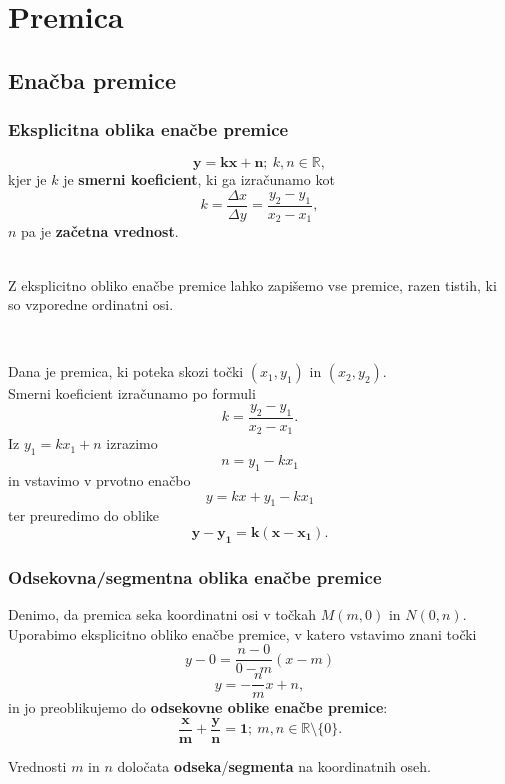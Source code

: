 \chapter{Premica}

    \section{Enačba premice}


            \subsection*{Eksplicitna oblika enačbe premice}
                $$ \mathbf{y=kx+n};~ k,n\in\mathbb{R},$$
                kjer je $k$ je \textbf{smerni koeficient}, ki ga izračunamo kot $$k=\dfrac{\Delta x}{\Delta y}=\dfrac{y_2-y_1}{x_2-x_1},$$                
                $n$ pa je \textbf{začetna vrednost}.

                ~\\
                Z eksplicitno obliko enačbe premice lahko zapišemo vse premice, razen tistih, ki so vzporedne ordinatni osi.

                ~

        Dana je premica, ki poteka skozi točki $(x_1,y_1)$ in $(x_2,y_2)$. \\
                Smerni koeficient izračunamo po formuli $$k=\dfrac{y_2-y_1}{x_2-x_1}.$$
                Iz $y_1=kx_1+n$ izrazimo $$n=y_1-kx_1$$
                in vstavimo v prvotno enačbo $$y=kx+y_1-kx_1$$
                ter preuredimo do oblike $$\mathbf{y-y_1=k(x-x_1)}.$$

                

        \subsection*{Odsekovna/segmentna oblika enačbe premice}
                Denimo, da premica seka koordinatni osi v točkah $M(m,0)$ in $N(0,n)$. \\
                Uporabimo eksplicitno obliko enačbe premice, v katero vstavimo znani točki
                $$y-0=\dfrac{n-0}{0-m}(x-m)$$ $$y=-\dfrac{n}{m}x+n,$$
                in  jo preoblikujemo do \textbf{odsekovne oblike enačbe premice}: 
                $$\mathbf{\dfrac{x}{m}+\dfrac{y}{n}=1}; ~m,n\in\mathbb{R}\setminus\{0\}.$$


                Vrednosti $m$ in $n$ določata \textbf{odseka}/\textbf{segmenta} na koordinatnih oseh.

